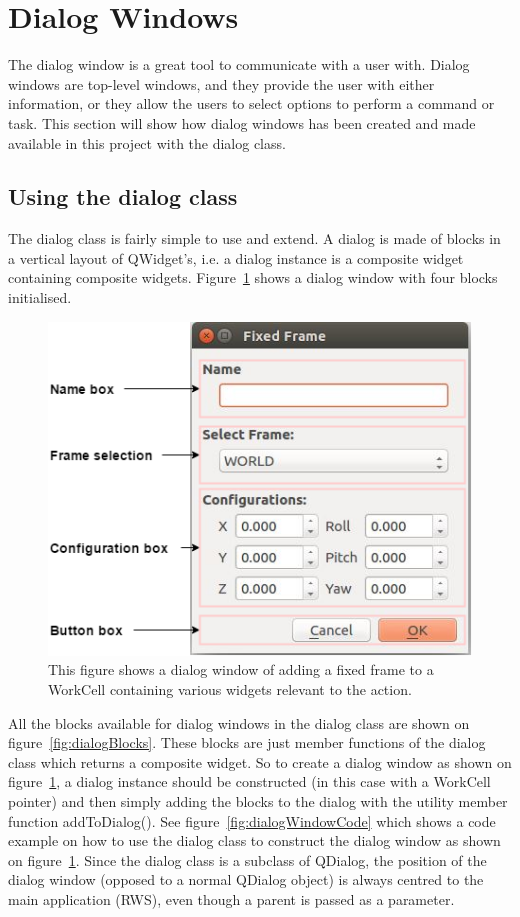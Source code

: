 \section{Dialog Windows}
\label{sec:DialogWindows}
The dialog window is a great tool to communicate with a user with. Dialog windows are top-level windows, and they provide the user with either information, or they allow the users to select options to perform a command or task. This section will show how dialog windows has been created and made available in this project with the dialog class.\\

\subsection{Using the dialog class}
The dialog class is fairly simple to use and extend. A dialog is made of blocks in a vertical layout of QWidget's, i.e. a dialog instance is a composite widget containing composite widgets. Figure~\ref{fig:dialogWindowExample} shows a dialog window with four blocks initialised.

\begin{figure}[h]
	\centering
	\includegraphics[scale=0.55]{Figures/dialogclassblocks.png}
	\caption{This figure shows a dialog window of adding a fixed frame to a WorkCell containing various widgets relevant to the action. }
	\label{fig:dialogWindowExample}
\end{figure}

All the blocks available for dialog windows in the dialog class are shown on figure~\ref{fig:dialogBlocks}. These blocks are just member functions of the dialog class which returns a composite widget. So to create a dialog window as shown on figure~\ref{fig:dialogWindowExample}, a dialog instance should be constructed (in this case with a WorkCell pointer) and then simply adding the blocks to the dialog with the utility member function addToDialog(). See figure~\ref{fig:dialogWindowCode} which shows a code example on how to use the dialog class to construct the dialog window as shown on figure~\ref{fig:dialogWindowExample}. Since the dialog class is a subclass of QDialog, the position of the dialog window (opposed to a normal QDialog object) is always centred to the main application (RWS), even though a parent is passed as a parameter.

